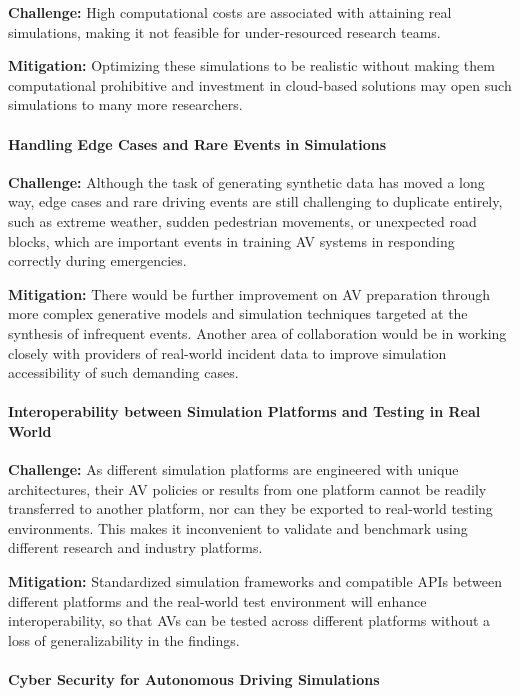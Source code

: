 \documentclass[lettersize,journal]{IEEEtran}
\begin{document}
\textbf{Challenge:} High computational costs are associated with attaining real simulations, making it not feasible for under-resourced research teams.

\textbf{Mitigation:} Optimizing these simulations to be realistic without making them computational prohibitive and investment in cloud-based solutions may open such simulations to many more researchers.

\paragraph{Handling Edge Cases and Rare Events in Simulations}

\textbf{Challenge:} Although the task of generating synthetic data has moved a long way, edge cases and rare driving events are still challenging to duplicate entirely, such as extreme weather, sudden pedestrian movements, or unexpected road blocks, which are important events in training AV systems in responding correctly during emergencies.

\textbf{Mitigation:} There would be further improvement on AV preparation through more complex generative models and simulation techniques targeted at the synthesis of infrequent events. Another area of collaboration would be in working closely with providers of real-world incident data to improve simulation accessibility of such demanding cases.

\paragraph{Interoperability between Simulation Platforms and Testing in Real World}

\textbf{Challenge:} As different simulation platforms are engineered with unique architectures, their AV policies or results from one platform cannot be readily transferred to another platform, nor can they be exported to real-world testing environments. This makes it inconvenient to validate and benchmark using different research and industry platforms.

\textbf{Mitigation:} Standardized simulation frameworks and compatible APIs between different platforms and the real-world test environment will enhance interoperability, so that AVs can be tested across different platforms without a loss of generalizability in the findings.

\paragraph{Cyber Security for Autonomous Driving Simulations}
\end{document}
